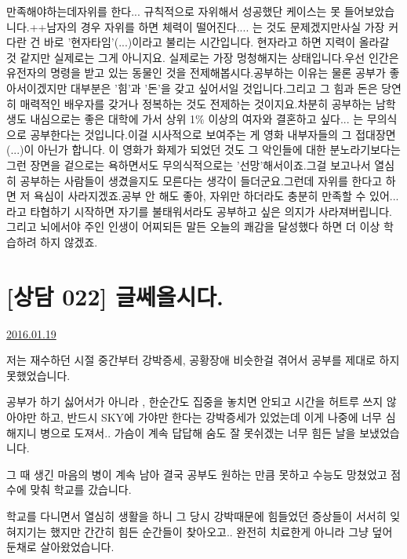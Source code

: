 만족해야하는데자위를 한다... 규칙적으로 자위해서 성공했단 케이스는 못 들어보았습니다.++남자의 경우 자위를 하면 체력이 떨어진다.... 는 것도 문제겠지만사실 가장 커다란 건 바로 '현자타임'(...)이라고 불리는 시간입니다. 현자라고 하면 지력이 올라갈 것 같지만 실제로는 그게 아니지요. 실제로는 가장 멍청해지는 상태입니다.우선 인간은 유전자의 명령을 받고 있는 동물인 것을 전제해봅시다.공부하는 이유는 물론 공부가 좋아서이겠지만 대부분은 '힘'과 '돈'을 갖고 싶어서일 것입니다.그리고 그 힘과 돈은 당연히 매력적인 배우자를 갖거나 정복하는 것도 전제하는 것이지요.차분히 공부하는 남학생도 내심으로는 좋은 대학에 가서 상위 1$\%$ 이상의 여자와 결혼하고 싶다... 는 무의식으로 공부한다는 것입니다.이걸 시사적으로 보여주는 게 영화 내부자들의 그 접대장면(...)이 아닌가 합니다. 이 영화가 화제가 되었던 것도 그 악인들에 대한 분노라기보다는 그런 장면을 겉으로는 욕하면서도 무의식적으로는 '선망'해서이죠.그걸 보고나서 열심히 공부하는 사람들이 생겼을지도 모른다는 생각이 들더군요.그런데 자위를 한다고 하면 저 욕심이 사라지겠죠.공부 안 해도 좋아, 자위만 하더라도 충분히 만족할 수 있어... 라고 타협하기 시작하면 자기를 불태워서라도 공부하고 싶은 의지가 사라져버립니다.그리고 뇌에서야 주인 인생이 어찌되든 말든 오늘의 쾌감을 달성했다 하면 더 이상 학습하려 하지 않겠죠.





\section{[상담 022] 글쎄올시다.}
\href{https://www.kockoc.com/Apoc/597010}{2016.01.19}

\vspace{5mm}

저는 재수하던 시절 중간부터 강박증세, 공황장애 비슷한걸 겪어서 공부를 제대로 하지 못했었습니다.
\vspace{5mm}

공부가 하기 싫어서가 아니라 , 한순간도 집중을 놓치면 안되고 시간을 허트루 쓰지 않아야만 하고, 반드시 SKY에 가야만 한다는 강박증세가 있었는데 이게 나중에 너무 심해지니 병으로 도져서.. 가슴이 계속 답답해 숨도 잘 못쉬겠는 너무 힘든 날을 보냈었습니다.
\vspace{5mm}

그 때 생긴 마음의 병이 계속 남아 결국 공부도 원하는 만큼 못하고 수능도 망쳤었고 점수에 맞춰 학교를 갔습니다.
\vspace{5mm}

학교를 다니면서 열심히 생활을 하니 그 당시 강박때문에 힘들었던 증상들이 서서히 잊혀지기는 했지만 간간히 힘든 순간들이 찾아오고.. 완전히 치료한게 아니라 그냥 덮어둔채로 살아왔었습니다.
\vspace{5mm}


